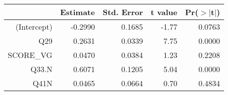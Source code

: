 \begin{table}[ht]
\centering
\begin{tabular}{rrrrr}
  \hline
 & Estimate & Std. Error & t value & Pr($>$$|$t$|$) \\ 
  \hline
(Intercept) & -0.2990 & 0.1685 & -1.77 & 0.0763 \\ 
  Q29 & 0.2631 & 0.0339 & 7.75 & 0.0000 \\ 
  SCORE\_VG & 0.0470 & 0.0384 & 1.23 & 0.2208 \\ 
  Q33.N & 0.6071 & 0.1205 & 5.04 & 0.0000 \\ 
  Q41N & 0.0465 & 0.0664 & 0.70 & 0.4834 \\ 
   \hline
\end{tabular}
\end{table}
